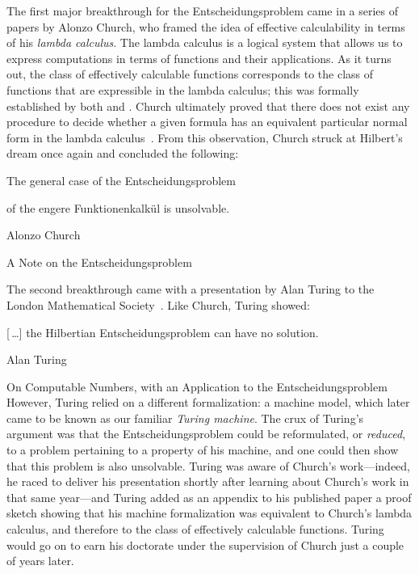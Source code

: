 The first major breakthrough for the Entscheidungsproblem came in a series of papers by Alonzo Church, who framed the idea of effective calculability in terms of his \emph{lambda calculus}. The lambda calculus is a logical system that allows us to express computations in terms of functions and their applications. As it turns out, the class of effectively calculable functions corresponds to the class of functions that are expressible in the lambda calculus; this was formally established by both \citet{Church1936UnsolvableProblemNumberTheory} and \citet{Kleene1936GeneralRecursiveFunctions, Kleene1936LambdaDefinability}. Church ultimately proved that there does not exist any procedure to decide whether a given formula has an equivalent particular normal form in the lambda calculus~\citeyearpar{Church1936NoteEntscheidungsproblem, Church1936UnsolvableProblemNumberTheory}. From this observation, Church struck at Hilbert's dream once again and concluded the following:\par
\epigraph{The general case of the Entscheidungsproblem\par
of the engere Funktionenkalk\"{u}l is unsolvable.}{Alonzo Church}{A Note on the Entscheidungsproblem}{}
\vspace{1em}

The second breakthrough came with a presentation by Alan Turing to the London Mathematical Society~\citeyearpar{Turing1936OnComputableNumbers}. Like Church, Turing showed:\par
\epigraph{\textup{[\,\dots]} the Hilbertian Entscheidungsproblem can have no solution.}{Alan Turing}{On Computable Numbers, with an Application to the Entscheidungsproblem}{}
\vspace{1em}
\noindent
However, Turing relied on a different formalization: a machine model, which later came to be known as our familiar \emph{Turing machine}. The crux of Turing's argument was that the Entscheidungsproblem could be reformulated, or \emph{reduced}, to a problem pertaining to a property of his machine, and one could then show that this problem is also unsolvable. Turing was aware of Church's work---indeed, he raced to deliver his presentation shortly after learning about Church's work in that same year---and Turing added as an appendix to his published paper a proof sketch showing that his machine formalization was equivalent to Church's lambda calculus, and therefore to the class of effectively calculable functions. Turing would go on to earn his doctorate under the supervision of Church just a couple of years later.


